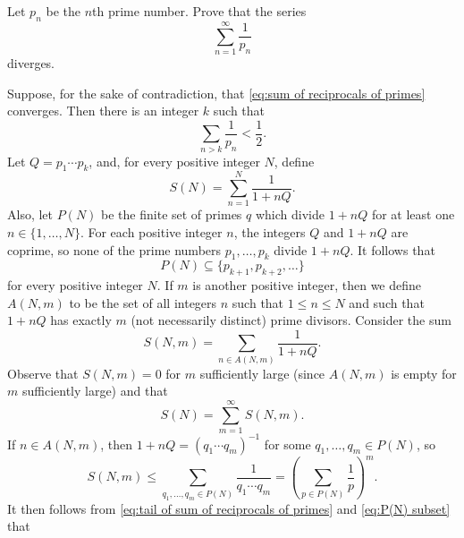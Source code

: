 \documentclass{homework}
\begin{document}
\begin{problem}
Let $p_n$ be the $n$th prime number.
Prove that the series
\begin{equation}
\label{eq:sum of reciprocals of primes}
\sum_{n=1}^\infty \frac{1}{p_n}
\end{equation}
diverges.
\end{problem}

\begin{solution}
Suppose, for the sake of contradiction, that
\eqref{eq:sum of reciprocals of primes} converges.
Then there is an integer $k$ such that
\begin{equation}
\label{eq:tail of sum of reciprocals of primes}
\sum_{n > k} \frac{1}{p_n} < \frac{1}{2}.
\end{equation}
Let $Q = p_1 \cdots p_k$, and, for every positive integer $N$, define
\begin{equation*}
S(N) = \sum_{n=1}^N \frac{1}{1 + n Q}.
\end{equation*}
Also, let $P(N)$ be the finite set of primes $q$ which divide $1 + n Q$ for at
least one $n \in \{1,\ldots,N\}$.
For each positive integer $n$, the integers $Q$ and $1 + n Q$ are coprime, so
none of the prime numbers $p_1,\ldots,p_k$ divide $1 + n Q$.
It follows that
\begin{equation}
\label{eq:P(N) subset}
P(N) \subseteq \{p_{k+1}, p_{k+2}, \ldots\}
\end{equation}
for every positive integer $N$.
If $m$ is another positive integer, then we define $A(N, m)$ to be the set of
all integers $n$ such that $1 \leq n \leq N$ and such that $1 + n Q$ has exactly
$m$ (not necessarily distinct) prime divisors.
Consider the sum
\begin{equation*}
S(N, m) = \sum_{n \in A(N, m)} \frac{1}{1 + n Q}.
\end{equation*}
Observe that $S(N, m) = 0$ for $m$ sufficiently large (since $A(N,m)$ is empty
for $m$ sufficiently large) and that
\begin{equation}
\label{eq:S(N) as sum}
S(N)
= \sum_{m=1}^\infty S(N, m).
\end{equation}
If $n \in A(N, m)$, then $1 + n Q =  (q_1\cdots q_m)^{-1}$ for some
$q_1,\ldots,q_m \in P(N)$, so
\begin{equation*}
S(N, m)
\leq \sum_{q_1,\ldots,q_m \in P(N)} \frac{1}{q_1\cdots q_m}
= \left(\sum_{p \in P(N)} \frac{1}{p}\right)^{m}.
\end{equation*}
It then follows from \eqref{eq:tail of sum of reciprocals of primes} and
\eqref{eq:P(N) subset} that

\end{solution}
\end{document}
